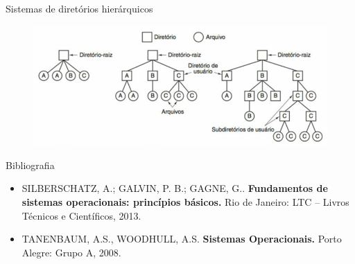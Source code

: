 \documentclass[aspectratio=169,
				xcolor=table]{beamer}
\begin{document}
	\begin{frame}{Sistemas de diretórios hierárquicos}
		
		\begin{figure}[hbtp]
			\centering
			\includegraphics[height=.7\paperheight]{../figs/cap09/diretorios.png}
		\end{figure}	
	\end{frame}
	
	
	\begin{frame}{Bibliografia}
		\begin{itemize}
			\item SILBERSCHATZ, A.; GALVIN, P. B.; GAGNE, G.. \textbf{Fundamentos de sistemas operacionais: princípios básicos.} Rio de Janeiro: LTC – Livros Técnicos e Científicos, 2013.
			
			\vspace{1em}

			\item TANENBAUM, A.S., WOODHULL, A.S. \textbf{Sistemas Operacionais.} Porto Alegre: Grupo A, 2008.
			
		\end{itemize}
	\end{frame}


	\begin{frame}{}
	\end{frame}	
	
\end{document}
